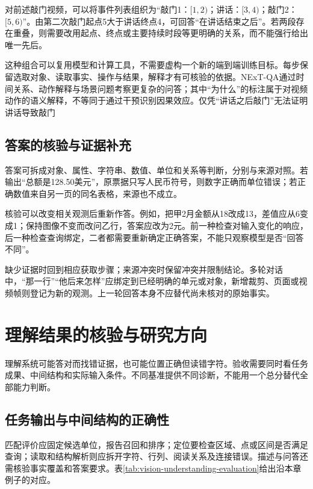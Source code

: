 对前述敲门视频，可以将事件列表组织为“敲门1：$[1,2)$；讲话：$[3,4)$；敲门2：$[5,6)$”。由第二次敲门起点5大于讲话终点4，可回答“在讲话结束之后”。若两段存在重叠，则需要改用起点、终点或主要持续时段等更明确的关系，而不能强行给出唯一先后。

这种组合可以复用模型和计算工具，不需要虚构一个新的端到端训练目标。每步保留选取对象、读取事实、操作与结果，解释才有可核验的依据。NExT-QA通过时间关系、动作解释与场景问题考察更复杂的问答；其中“为什么”的标注属于对视频动作的语义解释，不等同于通过干预识别因果效应。仅凭“讲话之后敲门”无法证明讲话导致敲门

\subsection{答案的核验与证据补充}
\label{sec:vision-understanding-answer-check}

答案可拆成对象、属性、字符串、数值、单位和关系等判断，分别与来源对照。若输出“总额是128.50美元”，原票据只写人民币符号，则数字正确而单位错误；若正确数值来自另一页的同名表格，来源也不成立。

核验可以改变相关观测后重新作答。例如，把甲2月金额从18改成13，差值应从6变成1；保持图像不变而改问乙行，答案应改为2元。前一种检查对输入变化的响应，后一种检查查询绑定，二者都需要重新确定正确答案，不能只观察模型是否“回答不同”。

缺少证据时回到相应获取步骤；来源冲突时保留冲突并限制结论。多轮对话中，“那一行”“他后来怎样”应绑定到已经明确的单元或对象，新增裁剪、页面或视频帧则登记为新的观测。上一轮回答本身不应替代尚未核对的原始事实。

\section{理解结果的核验与研究方向}
\label{sec:vision-understanding-evaluation}

理解系统可能答对而找错证据，也可能位置正确但读错字符。验收需要同时看任务成果、中间结构和实际输入条件。不同基准提供不同诊断，不能用一个总分替代全部能力判断。

\subsection{任务输出与中间结构的正确性}
\label{sec:vision-understanding-output-metrics}

匹配评价应固定候选单位，报告召回和排序；定位要检查区域、点或区间是否满足查询；读取和结构解析则应拆开字符、行列、阅读关系及连接错误。描述与问答还需核验事实覆盖和答案要求。表\ref{tab:vision-understanding-evaluation}给出沿本章例子的对应。

